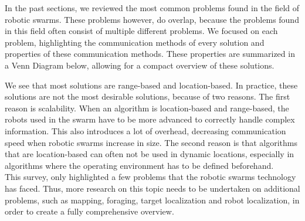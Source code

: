 

%

In the past sections, we reviewed the most common problems found in the field of robotic swarms. 
These problems however, do overlap, because the problems found in this field often consist of multiple different problems. 
We focused on each problem, highlighting the communication methods of every solution and properties of these communication methods. 
These properties are summarized in a Venn Diagram below, allowing for a compact overview of these solutions. 


We see that most solutions are range-based and location-based. 
In practice, these solutions are not the most desirable solutions, because of two reasons. 
The first reason is scalability. 
When an algorithm is location-based and range-based, the robots used in the swarm have to be more advanced to correctly handle complex information. 
This also introduces a lot of overhead, decreasing communication speed when robotic swarms increase in size. 
The second reason is that algorithms that are location-based can often not be used in dynamic locations, especially in algorithms where the operating environment has to be defined beforehand.\\

This survey, only highlighted a few problems that the robotic swarms technology has faced. Thus, more research on this topic needs to be undertaken on additional problems, such as mapping, foraging, target localization and robot localization, in order to create a fully comprehensive overview.

